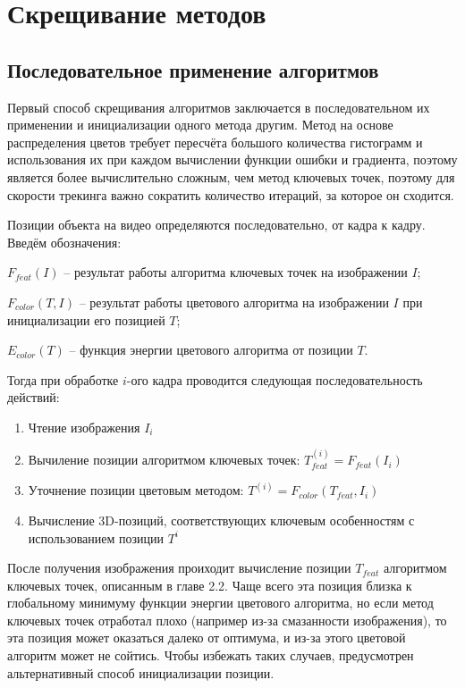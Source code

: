 \section{Скрещивание методов}

\subsection{Последовательное применение алгоритмов}
Первый способ скрещивания алгоритмов заключается в последовательном их применении и инициализации одного метода другим. Метод на основе распределения цветов требует пересчёта большого количества гистограмм и использования их при каждом вычислении функции ошибки и градиента, поэтому является более вычислительно сложным, чем метод ключевых точек, поэтому для скорости трекинга важно сократить количество итераций, за которое он сходится.

Позиции объекта на видео определяются последовательно, от кадра к кадру. Введём обозначения:

$F_{feat}(I)$ -- результат работы алгоритма ключевых точек на изображении $I$; 

$F_{color}(T, I)$ -- результат работы цветового алгоритма на изображении $I$ при инициализации его позицией $T$;

$E_{color}(T)$ -- функция энергии цветового алгоритма от позиции $T$.

Тогда при обработке $i$-ого кадра проводится следующая последовательность действий:

\begin{enumerate}
\item Чтение изображения $I_i$
\item Вычиление позиции алгоритмом ключевых точек: $T_{feat}^{(i)} = F_{feat}(I_i)$
\item Уточнение позиции цветовым методом: $T^{(i)} = F_{color}(T_{feat}, I_i)$
\item Вычисление  3D-позиций, соответствующих ключевым особенностям с использованием позиции $T^i$
\end{enumerate}

После получения изображения проиходит вычисление позиции $T_{feat}$ алгоритмом ключевых точек, описанным в главе 2.2.  Чаще всего эта позиция близка к глобальному минимуму функции энергии цветового алгоритма, но если метод ключевых точек отработал плохо (например из-за смазанности изображения), то эта позиция может оказаться далеко от оптимума, и из-за этого цветовой алгоритм может не сойтись. Чтобы избежать таких случаев, предусмотрен альтернативный способ инициализации позиции. 


